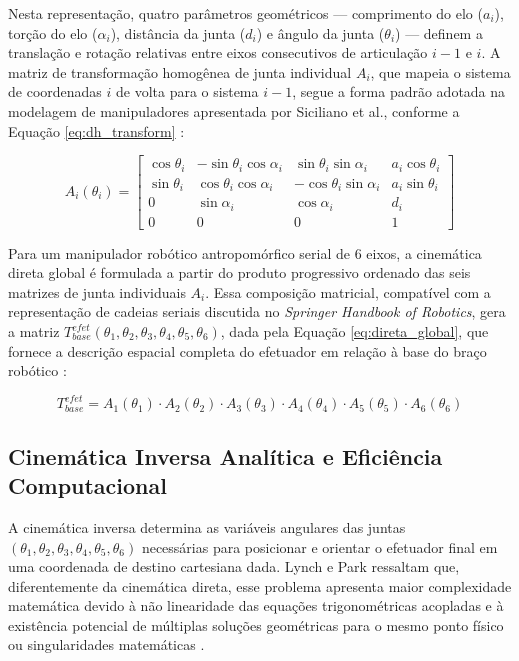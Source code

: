 Nesta representação, quatro parâmetros geométricos --- comprimento do elo ($a_i$), torção do elo ($\alpha_i$), distância da junta ($d_i$) e ângulo da junta ($\theta_i$) --- definem a translação e rotação relativas entre eixos consecutivos de articulação $i-1$ e $i$. A matriz de transformação homogênea de junta individual $A_i$, que mapeia o sistema de coordenadas $i$ de volta para o sistema $i-1$, segue a forma padrão adotada na modelagem de manipuladores apresentada por Siciliano et al., conforme a Equação \ref{eq:dh_transform} \cite{siciliano2009robotics}:

\begin{equation}
\label{eq:dh_transform}
A_i(\theta_i) = \begin{bmatrix}
\cos\theta_i & -\sin\theta_i\cos\alpha_i & \sin\theta_i\sin\alpha_i & a_i\cos\theta_i \\
\sin\theta_i & \cos\theta_i\cos\alpha_i & -\cos\theta_i\sin\alpha_i & a_i\sin\theta_i \\
0 & \sin\alpha_i & \cos\alpha_i & d_i \\
0 & 0 & 0 & 1
\end{bmatrix}
\end{equation}

Para um manipulador robótico antropomórfico serial de 6 eixos, a cinemática direta global é formulada a partir do produto progressivo ordenado das seis matrizes de junta individuais $A_i$. Essa composição matricial, compatível com a representação de cadeias seriais discutida no \textit{Springer Handbook of Robotics}, gera a matriz $T_{base}^{efet}(\theta_1, \theta_2, \theta_3, \theta_4, \theta_5, \theta_6)$, dada pela Equação \ref{eq:direta_global}, que fornece a descrição espacial completa do efetuador em relação à base do braço robótico \cite{siciliano2016springer}:

\begin{equation}
\label{eq:direta_global}
T_{base}^{efet} = A_1(\theta_1) \cdot A_2(\theta_2) \cdot A_3(\theta_3) \cdot A_4(\theta_4) \cdot A_5(\theta_5) \cdot A_6(\theta_6)
\end{equation}

\subsection{Cinemática Inversa Analítica e Eficiência Computacional}
\label{subsec:cinematica_inversa}

A cinemática inversa determina as variáveis angulares das juntas $(\theta_1, \theta_2, \theta_3, \theta_4, \theta_5, \theta_6)$ necessárias para posicionar e orientar o efetuador final em uma coordenada de destino cartesiana dada. Lynch e Park ressaltam que, diferentemente da cinemática direta, esse problema apresenta maior complexidade matemática devido à não linearidade das equações trigonométricas acopladas e à existência potencial de múltiplas soluções geométricas para o mesmo ponto físico ou singularidades matemáticas \cite{lynch2017modern}.


